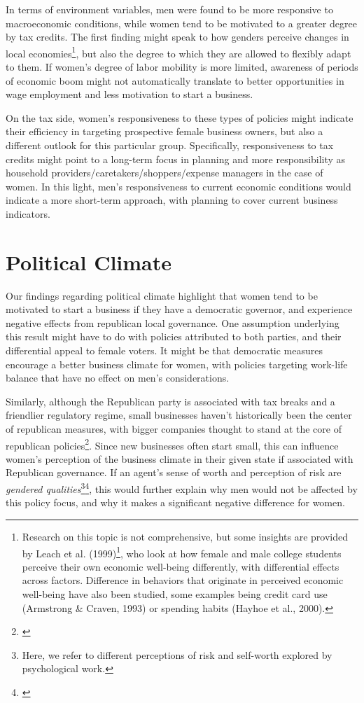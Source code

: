 In terms of environment variables, men were found to be more responsive to macroeconomic conditions, while women tend to be motivated to a greater degree by tax credits. The first finding might speak to how genders perceive changes in local economies\footnote{Research on this topic is not comprehensive, but some insights are provided by Leach et al. (1999)\footnote{\cite{LeachHayhoeTurner1999}}, who look at how female and male college students perceive their own economic well-being differently, with differential effects across factors. Difference in behaviors that originate in perceived economic well-being have also been studied, some examples being credit card use (Armstrong & Craven, 1993) or spending habits (Hayhoe et al., 2000).}, but also the degree to which they are allowed to flexibly adapt to them. If women's degree of labor mobility is more limited, awareness of periods of economic boom might not automatically translate to better opportunities in wage employment and less motivation to start a business. 

On the tax side, women's responsiveness to these types of policies might indicate their efficiency in targeting prospective female business owners, but also a different outlook for this particular group. Specifically, responsiveness to tax credits might point to a long-term focus in planning and more responsibility as household providers/caretakers/shoppers/expense managers in the case of women. In this light, men's responsiveness to current economic conditions would indicate a more short-term approach, with planning to cover current business indicators. 

\section{Political Climate}
Our findings regarding political climate highlight that women tend to be motivated to start a business if they have a democratic governor, and experience negative effects from republican local governance. One assumption underlying this result might have to do with policies attributed to both parties, and their differential appeal to female voters. It might be that democratic measures encourage a better business climate for women, with policies targeting work-life balance that have no effect on men's considerations. 

Similarly, although the Republican party is associated with tax breaks and a friendlier regulatory regime, small businesses haven't historically been the center of republican measures, with bigger companies thought to stand at the core of republican policies\footnote{\cite{Brown2010}}. Since new businesses often start small, this can influence women's perception of the business climate in their given state if associated with Republican governance. If an agent's sense of worth and perception of risk are \textit{gendered qualities}\footnote{Here, we refer to different perceptions of risk and self-worth explored by psychological work.}\footnote{\cite{adams2012beyond}}, this would further explain why men would not be affected by this policy focus, and why it makes a significant negative difference for women.

